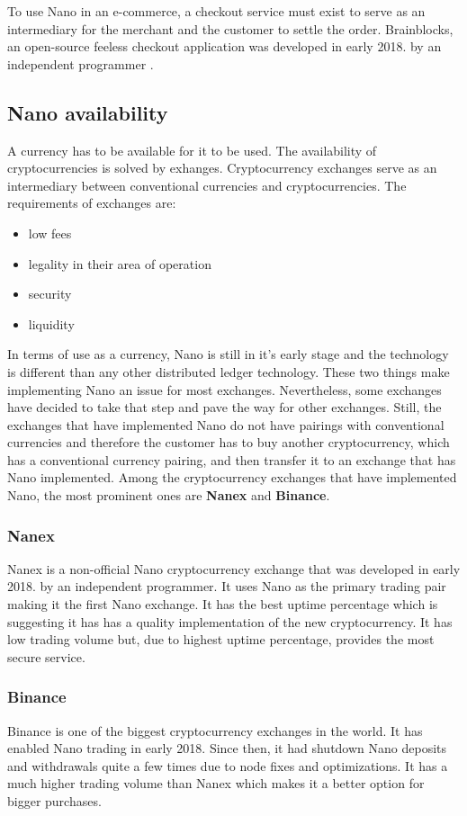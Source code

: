 \documentclass{ferseminar}
\begin{document}
To use Nano in an e-commerce, a checkout service must exist to serve as an intermediary for the merchant and the customer to settle the order. Brainblocks, an open-source feeless checkout application was developed in early 2018. by an independent programmer \cite{Brainblocks}.

\subsection{Nano availability}

A currency has to be available for it to be used. The availability of cryptocurrencies is solved by exhanges. Cryptocurrency exchanges serve as an intermediary between conventional currencies and cryptocurrencies. The requirements of exchanges are:
\begin{itemize}
	\item low fees
	\item legality in their area of operation
	\item security
	\item liquidity
\end{itemize}

In terms of use as a currency, Nano is still in it's early stage and the technology is different than any other distributed ledger technology. These two things make implementing Nano an issue for most exchanges. Nevertheless, some exchanges have decided to take that step and pave the way for other exchanges. Still, the exchanges that have implemented Nano do not have pairings with conventional currencies and therefore the customer has to buy another cryptocurrency, which has a conventional currency pairing, and then transfer it to an exchange that has Nano implemented. Among the cryptocurrency exchanges that have implemented Nano, the most prominent ones are \textbf{Nanex} and \textbf{Binance}.

\subsubsection{Nanex}
Nanex is a non-official Nano cryptocurrency exchange that was developed in early 2018. by an independent programmer. It uses Nano as the primary trading pair making it the first Nano exchange. It has the best uptime percentage which is suggesting it has has a quality implementation of the new cryptocurrency. It has low trading volume but, due to highest uptime percentage, provides the most secure service.

\subsubsection{Binance}
Binance is one of the biggest cryptocurrency exchanges in the world. It has enabled Nano trading in early 2018. Since then, it had shutdown Nano deposits and withdrawals quite a few times due to node fixes and optimizations. It has a much higher trading volume than Nanex which makes it a better option for bigger purchases.
 
\end{document}
